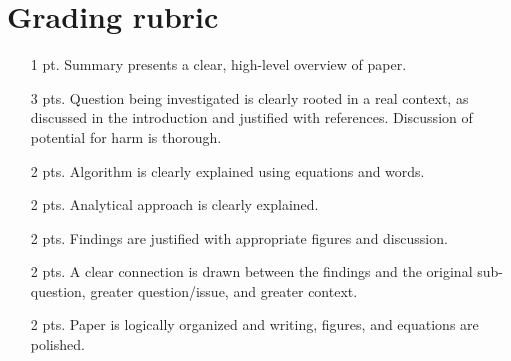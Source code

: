 \section{Grading rubric}
\begin{itemize}
\item [1 pt.] Summary presents a clear, high-level overview of paper.
\item [3 pts.] Question being investigated is clearly rooted in a real context, as discussed in the introduction and justified with references. Discussion of potential for harm is thorough.
\item [2 pts.] Algorithm is clearly explained using equations and words.
\item [2 pts.] Analytical approach is clearly explained.
\item [2 pts.] Findings are justified with appropriate figures and discussion.
\item [2 pts.] A clear connection is drawn between the findings and the original sub-question, greater question/issue, and greater context.
\item [2 pts.] Paper is logically organized and writing, figures, and equations are polished.
\end{itemize}

\pagebreak
\shipoutAnswer
